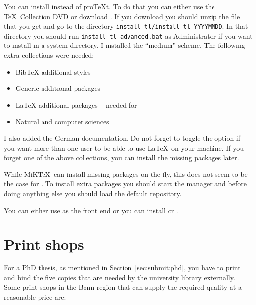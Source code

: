 \subsection{\TeXLive}
\label{sec:app:texlive}

You can install \TeXLive instead of pro\TeX t. To do that you can
either use the \TeX\ Collection DVD or download \TeXLive. If you
download \TeXLive you should unzip the file that you get and go to the
directory \texttt{install-tl/install-tl-YYYYMMDD}. In that directory you
should run \texttt{install-tl-advanced.bat} as Administrator if you want to install
\TeXLive in a system directory. I installed the \enquote{medium}
scheme. The following extra collections were needed:
\begin{itemize}
\item \textsf{BibTeX additional styles}
\item \textsf{Generic additional packages}
\item \textsf{LaTeX additional packages} -- needed for 
\item \textsf{Natural and computer sciences}
\end{itemize}
I also added the German documentation. Do not forget to toggle the
option  if you want more than one user to be able to
use \LaTeX\ on your machine. If you forget one of the above
collections, you can install the missing packages later.

While MiK\TeX\ can install missing packages on the fly, this does not
seem to be the case for \TeXLive. To install extra packages you should
start the \TeXLive manager and before doing anything else you should
load the default repository.

You can either use \TeXworks as the front end or you can install
\TeXstudio or \TeXmaker.


\chapter{Print shops}
\label{app:printer}

For a PhD thesis, as mentioned in Section~\ref{sec:submit:phd}, you
have to print and bind the five copies that are needed by the
university library externally. Some print shops in the Bonn region
that can supply the required quality at a reasonable price are:

